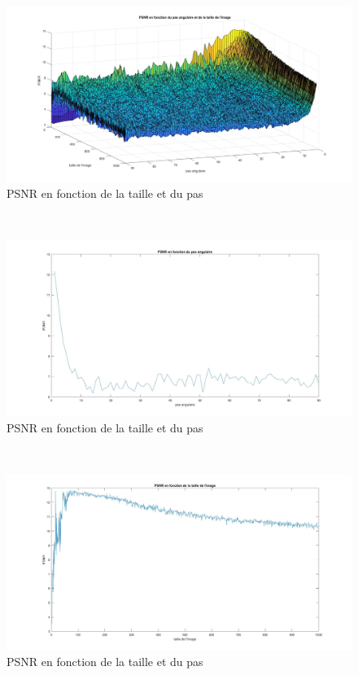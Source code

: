 \documentclass[conference]{IEEEtran}
\begin{document}
\newpage
\begin{figure}[H]
\centering
\includegraphics[scale=0.40, angle=-90]{PSNR1}
	\caption[PSNR en fonction de la taille et du pas]{PSNR en fonction de la taille et du pas}
\label{fig:gallery}
\end{figure}

\newpage $ $

\begin{figure}[H]
\centering
\includegraphics[scale=0.40, angle=-90]{PSNR2}
	\caption[PSNR en fonction de la taille et du pas]{PSNR en fonction de la taille et du pas}
\label{fig:gallery}
\end{figure}

\newpage $ $
\begin{figure}[H]
\centering
\includegraphics[scale=0.40, angle=-90]{PSNR3}
	\caption[PSNR en fonction de la taille et du pas]{PSNR en fonction de la taille et du pas}
\label{fig:gallery}
\end{figure}




\end{document}
